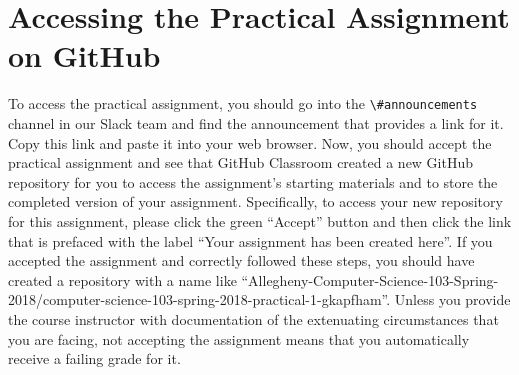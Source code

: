 \documentclass[11pt]{article}
\newcommand{\url}[1]{\lstinline{#1}}
\newcommand{\channel}[1]{\lstinline{#1}}
\begin{document}



\section*{Accessing the Practical Assignment on GitHub}

To access the practical assignment, you should go into the \channel{\#announcements} channel in our Slack team and find
the announcement that provides a link for it. Copy this link and paste it into your web browser. Now, you should accept
the practical assignment and see that GitHub Classroom created a new GitHub repository for you to access the
assignment's starting materials and to store the completed version of your assignment. Specifically, to access your new
repository for this assignment, please click the green ``Accept'' button and then click the link that is prefaced with
the label ``Your assignment has been created here''. If you accepted the assignment and correctly followed these steps,
you should have created a repository with a name like
``Allegheny-Computer-Science-103-Spring-2018/computer-science-103-spring-2018-practical-1-gkapfham''. Unless you provide
the course instructor with documentation of the extenuating circumstances that you are facing, not accepting the
assignment means that you automatically receive a failing grade for it.
\end{document}
